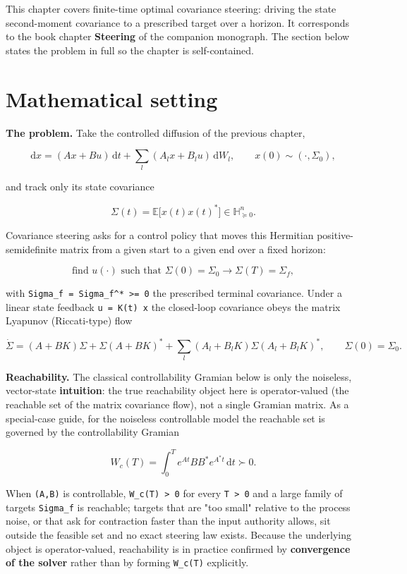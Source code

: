 \documentclass[11pt,oneside]{report}
\newcommand{\code}[1]{\texttt{#1}}
\begin{document}
This chapter covers finite-time optimal covariance steering: driving the state
second-moment covariance to a prescribed target over a horizon. It corresponds
to the book chapter \textbf{Steering} of the companion monograph. The section below
states the problem in full so the chapter is self-contained.

\hypertarget{mathematical-setting}{%
\section{Mathematical setting}\label{mathematical-setting}}

\textbf{The problem.} Take the controlled diffusion of the previous chapter,

\[
\mathrm{d}x = (A x + B u)\,\mathrm{d}t
  + \sum_l (A_l x + B_l u)\,\mathrm{d}W_l ,
\qquad x(0) \sim ( \cdot , \Sigma_0) ,
\]

and track only its state covariance

\[
\Sigma(t) = \mathbb{E}\big[x(t)x(t)^{*}\big] \in \mathbb{H}^{n}_{\succeq 0} .
\]

Covariance steering asks for a control policy that moves this Hermitian
positive-semidefinite matrix from a given start to a given end over a fixed
horizon:

\[
\text{find } u(\cdot) \text{ such that }
\Sigma(0) = \Sigma_0  \longrightarrow  \Sigma(T) = \Sigma_f ,
\]

with \code{Sigma\_f = Sigma\_f\^{}* \textgreater{}= 0} the prescribed terminal covariance. Under a
linear state feedback \code{u = K(t) x} the closed-loop covariance obeys the matrix
Lyapunov (Riccati-type) flow

\[
\dot\Sigma = (A + B K)\Sigma + \Sigma (A + B K)^{*}
   + \sum_l (A_l + B_l K)\Sigma (A_l + B_l K)^{*} ,
\qquad \Sigma(0) = \Sigma_0 .
\]

\textbf{Reachability.} The classical controllability Gramian below is only the
noiseless, vector-state \textbf{intuition}: the true reachability object here is
operator-valued (the reachable set of the matrix covariance flow), not a single
Gramian matrix. As a special-case guide, for the noiseless controllable model
the reachable set is governed by the controllability Gramian

\[
W_c(T) = \int_0^T e^{A t} B B^{*} e^{A^{*} t}\,\mathrm{d}t \succ 0 .
\]

When \code{(A,B)} is controllable, \code{W\_c(T) \textgreater{} 0} for every \code{T \textgreater{} 0} and a large family
of targets \code{Sigma\_f} is reachable; targets that are "too small" relative to the
process noise, or that ask for contraction faster than the input authority
allows, sit outside the feasible set and no exact steering law exists. Because
the underlying object is operator-valued, reachability is in practice confirmed by
\textbf{convergence of the solver} rather than by forming \code{W\_c(T)} explicitly.
\end{document}
